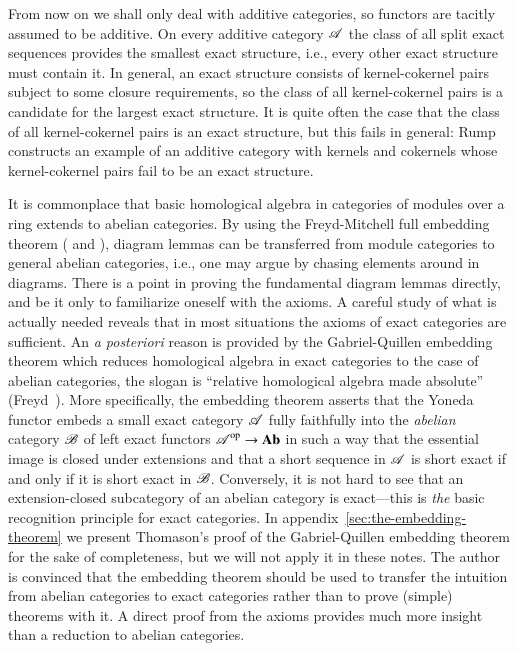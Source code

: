 \documentclass[1p]{elsarticle}
\theoremstyle{mythm}
\theoremstyle{mydef}
\begin{document}
From now on we shall only deal with additive categories, so functors
are tacitly assumed to be additive. On every additive category
$\operatorname{\mathscr{A}}$ the class of all split exact sequences provides the smallest
exact structure, i.e., every other exact structure must
contain it. In general, an exact structure consists of kernel-cokernel
pairs subject to some closure requirements, so the class of all
kernel-cokernel pairs is a candidate for the largest exact
structure. It is quite often the case that the class of all
kernel-cokernel pairs is an exact structure, but this fails in
general: Rump~\cite{rump-counterexample} constructs an example of an
additive category with kernels and cokernels whose kernel-cokernel
pairs fail to be an exact structure.

It is commonplace that basic homological algebra in categories of
modules over a ring extends to abelian
categories. By using the Freyd-Mitchell full embedding
theorem (\cite{MR0166240} and \cite{MR0167511}), diagram lemmas
can be transferred from module categories to general abelian categories, 
i.e., one may argue by chasing elements around in diagrams. 
There is a point in proving the fundamental diagram lemmas
directly, and be it only to familiarize oneself
with the axioms. A careful study of what is actually needed 
reveals that in most situations
the axioms of exact categories are sufficient. An \emph{a posteriori}
reason is provided by the Gabriel-Quillen embedding theorem which
reduces homological algebra in exact categories to the case of abelian
categories, the slogan is ``relative homological algebra made
absolute'' (Freyd~\cite{MR0146234}). More specifically, the embedding
theorem asserts that the Yoneda functor embeds a small exact category
$\operatorname{\mathscr{A}}$ fully faithfully into the \emph{abelian} category $\operatorname{\mathscr{B}}$ 
of left exact functors $\operatorname{\mathscr{A}}^{\operatorname{op}} \to \operatorname{\mathbf{Ab}}$
in such a way that the essential image is closed under
extensions and that a short sequence in $\operatorname{\mathscr{A}}$ is short exact if and
only if it is short exact in $\operatorname{\mathscr{B}}$. 
Conversely, it is not hard to see that an extension-closed
subcategory of an abelian category is exact---this is \emph{the} basic
recognition principle for exact categories.
In appendix~\ref{sec:the-embedding-theorem} we present Thomason's
proof of the Gabriel-Quillen embedding theorem for the
sake of completeness, but we will not apply it in these notes. 
The author is convinced that the
embedding theorem should be used to transfer the intuition from
abelian categories to exact categories rather than to prove (simple) theorems
with it. A direct proof from the axioms provides much more insight
than a reduction to abelian categories.
\end{document}
